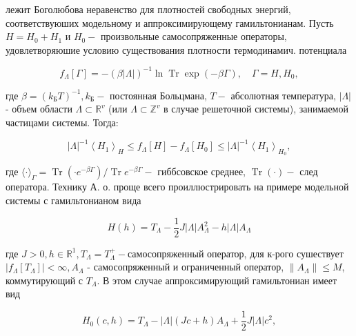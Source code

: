 \documentclass[10pt]{article}
\begin{document}
лежит Боголюбова неравенство для плотностей свободных энергий, соответствуюших модельному и аппроксимирующему гамильтонианам. Пусть $H=H_{0}+H_{1}$ и $H_{0}-$ произвольные самосопряженные операторы, удовлетворяюшие условию существования плотности термодинамич. потенциала



\[

f_{\Lambda}[\Gamma]=-(\beta|\Lambda|)^{-1} \ln \operatorname{Tr} \exp (-\beta \Gamma), \quad \Gamma=H, H_{0},

\]



где $\beta=\left(k_{\mathrm{Б}} T\right)^{-1}, k_{\mathrm{Б}}-$ постоянная Больцмана, $T-$ абсолютная температура, $|\Lambda|$ - объем области $\Lambda \subset \mathbb{R}^{v}$ (или $\Lambda \subset \mathbb{Z}^{v}$ в случае решеточной системы), занимаемой частицами системы. Тогда:



\[

|\Lambda|^{-1}\left\langle H_{1}\right\rangle_{H} \leqslant f_{\Lambda}[H]-f_{\Lambda}\left[H_{0}\right] \leqslant|\Lambda|^{-1}\left\langle H_{1}\right\rangle_{H_{0}},

\]



где $\langle\cdot\rangle_{\Gamma}=\operatorname{Tr}\left(\cdot e^{-\beta \Gamma}\right) / \operatorname{Tr} e^{-\beta \Gamma}-$ гиббсовское среднее, $\operatorname{Tr}(\cdot)-$ след оператора. Технику А. о. проще всего проиллюстрировать на примере модельной системы с гамильтонианом вида



\[

H(h)=T_{\Lambda}-\frac{1}{2} J|\Lambda| A_{\Lambda}^{2}-h|\Lambda| A_{\Lambda}

\]



где $J>0, h \in \mathbb{R}^{1}, T_{\Lambda}=T_{\Lambda}^{+}-$самосопряженный оператор, для к-рого сушествует $\left|f_{\Lambda}\left[T_{\Lambda}\right]\right|<\infty, A_{\Lambda}$ - самосопряженный и ограниченный оператор, $\left\|A_{\Lambda}\right\| \leqslant M$, коммутирующий с $T_{\Lambda}$. В этом случае аппроксимирующий гамильтониан имеет вид



\[

H_{0}(c, h)=T_{\Lambda}-|\Lambda|(J c+h) A_{\Lambda}+\frac{1}{2} J|\Lambda| c^{2},

\]
\end{document}
